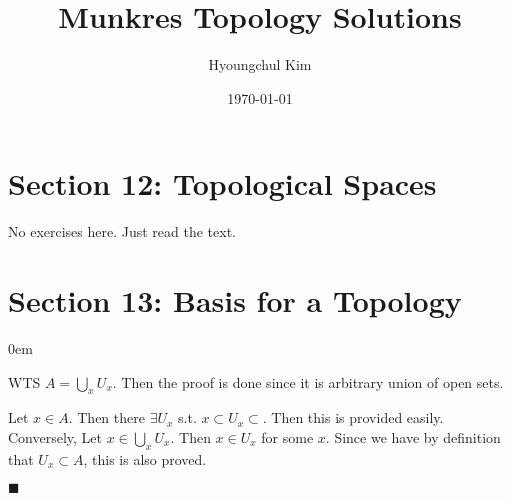 \documentclass[12pt]{article}
\renewcommand{\qed}{\hfill$\blacksquare$}
\renewenvironment{proof}{\begin{addmargin}[1em]{0em}\begin{newproof}}{\end{newproof}\end{addmargin}\qed}
\newenvironment{exercise}[2][Exercise]{\begin{trivlist}
\item[\hskip \labelsep {\bfseries #1}\hskip \labelsep {\bfseries #2.}]}{\end{trivlist}}
\begin{document}
 

\title{Munkres Topology Solutions} %
\author{Hyoungchul Kim}
\date{\today} %
\maketitle %

\tableofcontents

\rhead{\today}

\section{Section 12: Topological Spaces}

No exercises here. Just read the text.

\section{Section 13: Basis for a Topology}

\begin{exercise}{12.1}
\end{exercise}

\begin{proof}
	WTS $A = \bigcup_x U_x$. Then the proof is done since it is arbitrary union of open sets. 

Let $x \in A.$ Then there  $\exists U_x$ s.t. $x \subset U_x \subset.$ Then this is provided easily. Conversely, Let $x \in \bigcup_{x} U_x.$ Then $x \in U_x$ for some $x$. Since we have by definition that $U_x \subset A$, this is also proved.
\end{proof}

\begin{exercise}{12.4}

\end{exercise}
\end{document}
